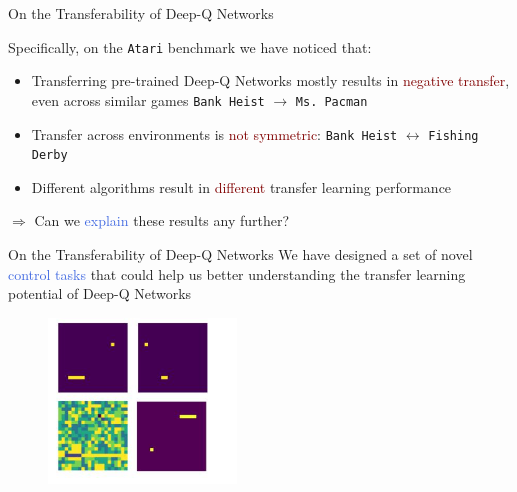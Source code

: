 \documentclass{beamer}
\begin{document}
\begin{frame}{On the Transferability of Deep-Q Networks}

	Specifically, on the \texttt{Atari} benchmark we have noticed that:
	\bigskip
	\begin{itemize}
		\item Transferring pre-trained Deep-Q Networks mostly results in \textcolor{Maroon}{negative transfer}, even across similar games \texttt{Bank Heist} $\rightarrow$ \texttt{Ms. Pacman}
		\item Transfer across environments is \textcolor{Maroon}{not symmetric}: \texttt{Bank Heist} $\leftrightarrow$ \texttt{Fishing Derby}
		\item Different algorithms result in \textcolor{Maroon}{different} transfer learning performance
	\end{itemize}

	\bigskip

	$\Rightarrow$ Can we \textcolor{RoyalBlue}{explain} these results any further?

\end{frame}

\begin{frame}{On the Transferability of Deep-Q Networks}
	\bigskip
	We have designed a set of novel \textcolor{RoyalBlue}{control tasks} that could help us better understanding the transfer learning potential of Deep-Q Networks 
	\bigskip
	\begin{figure}[ht]
\begin{minipage}{0.5\textwidth}
	\centering
	\includegraphics[width=5cm]{./figures/catch_games}
\end{minipage}%
\begin{minipage}{0.5\textwidth}
	\centering
	
\end{minipage}
\label{fig:catch_baselines}
\end{figure}

\end{frame}
\end{document}
